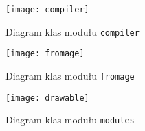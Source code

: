 \begin{figure}[h!]
  \begin{center}
    \texttt{[image: compiler]}
  \end{center}
  \caption{Diagram klas modułu \texttt{compiler}}
\end{figure}

\begin{figure}[h!]
  \begin{center}
    \texttt{[image: fromage]}
  \end{center}
  \caption{Diagram klas modułu \texttt{fromage}}
\end{figure}

\begin{figure}[h!]
  \begin{center}
    \texttt{[image: drawable]}
  \end{center}
  \caption{Diagram klas modułu \texttt{modules}}
\end{figure}
